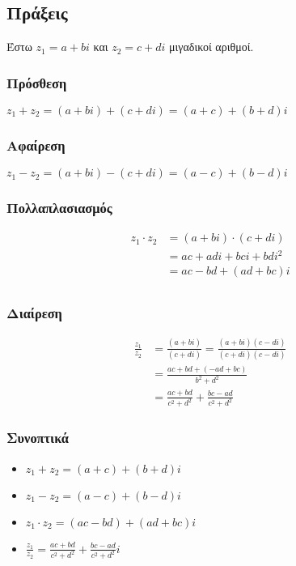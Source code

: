   \subsection*{Πράξεις}

    Έστω $z_{1}=a+bi$ και $z_{2}=c+di$ μιγαδικοί αριθμοί.

\begin{multicols}{2}
  \subsubsection*{Πρόσθεση}
  $z_{1}+z_{2}=(a+bi)+(c+di)=(a+c)+(b+d)i$

  \columnbreak

  \subsubsection*{Αφαίρεση}
  $z_{1}-z_{2}=(a+bi)-(c+di)=(a-c)+(b-d)i$
\end{multicols}

\begin{multicols}{2}
  \subsubsection*{Πολλαπλασιασμός}
        \begin{align*}
          z_{1}\cdot z_{2}&=(a+bi)\cdot (c+di) \\
            &=ac+adi+bci+bdi^{2} \\
            &=ac-bd+(ad+bc)i \\
        \end{align*}

        \columnbreak

        \subsubsection*{Διαίρεση}
        \begin{align*}
          \frac{z_{1}}{z_{2}}&=\frac{(a+bi)}{(c+di)}     =\frac{(a+bi)(c-di)}{(c+di)(c-di)} \\
            &=\frac{ac+bd+(-ad+bc)}{b^{2}+d^{2}} \\
            &=\frac{ac+bd}{c^2+d^2}+\frac{bc-ad}{c^2+d^2}
        \end{align*}

\end{multicols}



  \subsubsection*{Συνοπτικά}
  \begin{itemize}
    \item $z_{1}+z_{2}=(a+c)+(b+d)i$
    \item $z_{1}-z_{2}=(a-c)+(b-d)i$
    \item $z_{1}\cdot z_{2}=(ac-bd)+(ad+bc)i$
    \item $\frac{z_{1}}{z_{2}}=\frac{ac+bd}{c^2+d^2}+\frac{bc-ad}{c^2+d^2}i$
  \end{itemize}

